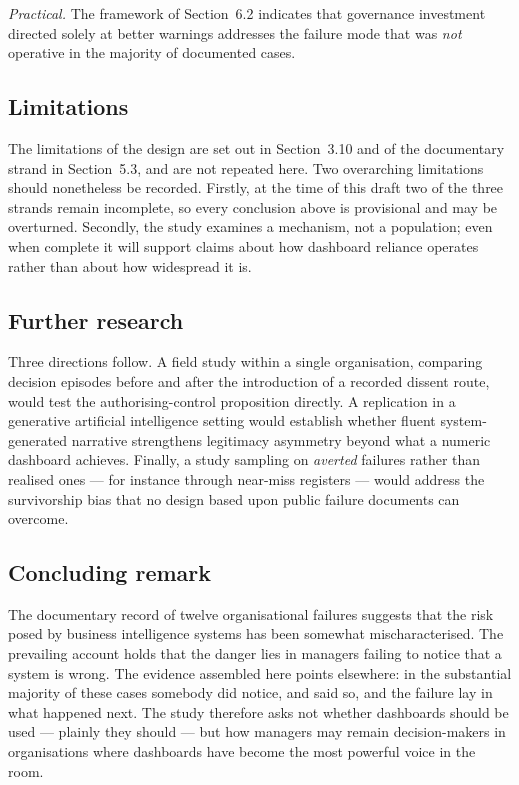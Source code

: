 \documentclass[11pt,a4paper]{article}
\numberwithin{figure}{section}
\numberwithin{table}{section}
\begin{document}
\emph{Practical.} The framework of Section~6.2 indicates that governance investment directed solely at
better warnings addresses the failure mode that was \emph{not} operative in the majority of documented
cases.

\subsection{Limitations}

The limitations of the design are set out in Section~3.10 and of the documentary strand in Section~5.3, and
are not repeated here. Two overarching limitations should nonetheless be recorded. Firstly, at the time of
this draft two of the three strands remain incomplete, so every conclusion above is provisional and may be
overturned. Secondly, the study examines a mechanism, not a population; even when complete it will support
claims about how dashboard reliance operates rather than about how widespread it is.

\subsection{Further research}

Three directions follow. A field study within a single organisation, comparing decision episodes before and
after the introduction of a recorded dissent route, would test the authorising-control proposition
directly. A replication in a generative artificial intelligence setting would establish whether fluent
system-generated narrative strengthens legitimacy asymmetry beyond what a numeric dashboard achieves.
Finally, a study sampling on \emph{averted} failures rather than realised ones --- for instance through
near-miss registers --- would address the survivorship bias that no design based upon public failure
documents can overcome.

\subsection{Concluding remark}

The documentary record of twelve organisational failures suggests that the risk posed by business
intelligence systems has been somewhat mischaracterised. The prevailing account holds that the danger lies
in managers failing to notice that a system is wrong. The evidence assembled here points elsewhere: in the
substantial majority of these cases somebody did notice, and said so, and the failure lay in what happened
next. The study therefore asks not whether dashboards should be used --- plainly they should --- but how
managers may remain decision-makers in organisations where dashboards have become the most powerful voice
in the room.
\end{document}
